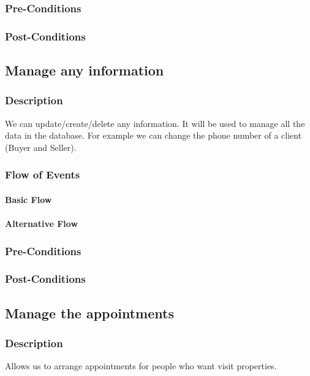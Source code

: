 \documentclass[a4paper,12pt]{article}
\begin{document}
\subsubsection{Pre-Conditions}
\subsubsection{Post-Conditions}

\subsection{Manage any information}
\subsubsection{Description}
We can update/create/delete any information. It will be used to manage all the data in the database.
For example we can change the phone number of a client (Buyer and Seller).
\subsubsection{Flow of Events}
\paragraph{Basic Flow}
\begin{itemize}
\end{itemize}

\paragraph{Alternative Flow}
\begin{itemize}
\end{itemize}

\subsubsection{Pre-Conditions}
\subsubsection{Post-Conditions}

\subsection{Manage the appointments}
\subsubsection{Description}
Allows us to arrange appointments for people who want visit properties.
\end{document}
